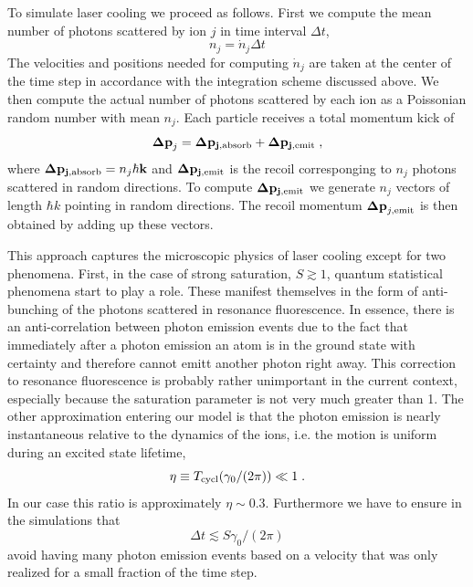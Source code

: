\documentclass[aps, pra, preprint]{revtex4-1}
\begin{document}
To simulate laser cooling we proceed as follows.  First we compute the
mean number of photons scattered by ion $j$ in time interval $\Delta t$,
\begin{equation}
n_j=\dot{n}_j \Delta t
\end{equation}
The velocities and positions needed for computing $\dot{n}_j$ are taken
at the center of the time step in accordance with the integration scheme
discussed above.  We then compute the actual number of photons scattered
by each ion as a Poissonian random number with mean $n_j$.  Each
particle receives a total momentum kick of 
\begin{equation}
\mathbf{\Delta p}_j = \mathbf{\Delta p_{j,{\rm absorb}}} + 
\mathbf{\Delta p_{j,{\rm emit}}}\;,
\end{equation}
where $\mathbf{\Delta p_{j,{\rm absorb}}}=n_j \hbar \mathbf{k}$ and
$\mathbf{\Delta p_{j,{\rm emit}}}$ is the recoil corresponging to $n_j$
photons scattered in random directions.  To compute $\mathbf{\Delta
p_{j,{\rm emit}}}$ we generate $n_j$ vectors of length $\hbar k$
pointing in random directions.  The recoil momentum $\mathbf{\Delta
p}_{j,{\rm emit}}$ is then obtained by adding up these vectors.

This approach captures the microscopic physics of laser cooling except
for two phenomena.  First, in the case of strong saturation,
$S\gtrsim 1$, quantum statistical phenomena start to play a role.
These manifest themselves in the form of anti-bunching of the photons
scattered in resonance fluorescence.  In essence, there is an
anti-correlation between photon emission events due to the fact that
immediately after a photon emission an atom is in the ground state with
certainty and therefore cannot emitt another photon right away.  This
correction to resonance fluorescence is probably rather unimportant in
the current context, especially because the saturation parameter is not
very much greater than 1.  The other approximation entering our model is
that the photon emission is nearly instantaneous relative to the
dynamics of the ions, i.e. the motion is uniform during an excited
state lifetime,
\begin{equation}
\eta \equiv T_{\rm cycl}(\gamma_0/(2\pi)) \ll 1\;.
\end{equation}
In our case this ratio is approximately $\eta \sim 0.3$.  Furthermore we
have to ensure in the simulations that
\begin{equation}
\Delta t \lesssim S\gamma_0/(2\pi)
\end{equation}
avoid having many photon emission events based on a velocity that was
only realized for a small fraction of the time step.
\end{document}
